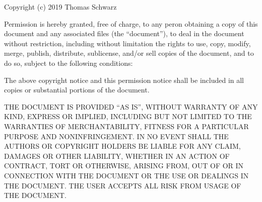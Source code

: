 \documentclass[11pt, titlepage]{article}
\begin{document}
Copyright (c) 2019 Thomas Schwarz

Permission is hereby granted, free of charge, to any peron obtaining a copy of this document and any associated files (the ``document''), to deal in the document without restriction, including without limitation the rights to use, copy, modify, merge, publish, distribute, sublicense, and/or sell copies of the document, and to do so, subject to the following conditions:

The above copyright notice and this permission notice shall be included in all copies or substantial portions of the document.

THE DOCUMENT IS PROVIDED ``AS IS'', WITHOUT WARRANTY OF ANY KIND, EXPRESS OR IMPLIED, INCLUDING BUT NOT LIMITED TO THE WARRANTIES OF MERCHANTABILITY, FITNESS FOR A PARTICULAR PURPOSE AND NONINFRINGEMENT. IN NO EVENT SHALL THE AUTHORS OR COPYRIGHT HOLDERS BE LIABLE FOR ANY CLAIM, DAMAGES OR OTHER LIABILITY, WHETHER IN AN ACTION OF CONTRACT, TORT OR OTHERWISE, ARISING FROM, OUT OF OR IN CONNECTION WITH THE DOCUMENT OR THE USE OR DEALINGS IN THE DOCUMENT. THE USER ACCEPTS ALL RISK FROM USAGE OF THE DOCUMENT.
\end{document}

